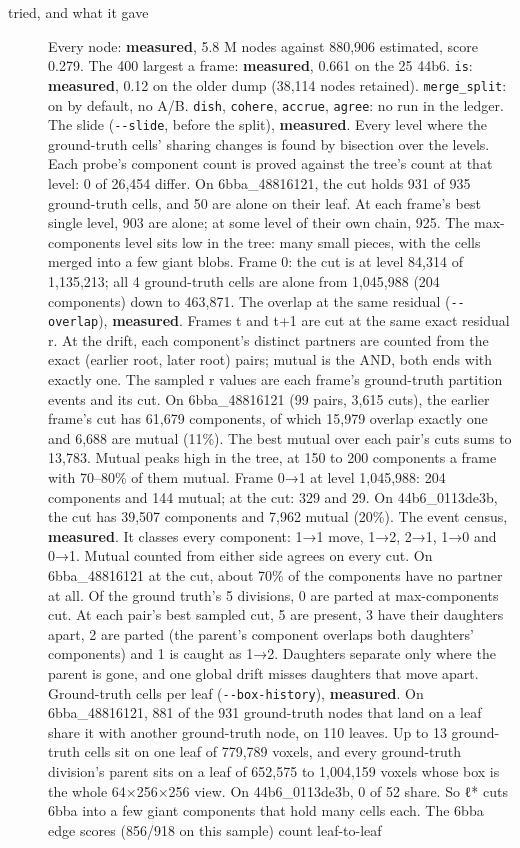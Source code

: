 \begin{description}
\item[{tried, and what it gave}] Every node: \textbf{measured}, 5.8 M nodes against 880,906 estimated, score 0.279. The 400 largest a frame: \textbf{measured}, 0.661 on the 25 44b6. \texttt{is}: \textbf{measured}, 0.12 on the older dump (38,114 nodes retained). \texttt{merge\_\allowbreak{}split}: on by default, no A/B. \texttt{dish}, \texttt{cohere}, \texttt{accrue}, \texttt{agree}: no run in the ledger. The slide (\texttt{-\allowbreak{}-\allowbreak{}slide}, before the split), \textbf{measured}. Every level where the ground-truth cells' sharing changes is found by bisection over the levels. Each probe's component count is proved against the tree's count at that level: 0 of 26,454 differ. On 6bba\_\allowbreak{}48816121, the cut holds 931 of 935 ground-truth cells, and 50 are alone on their leaf. At each frame's best single level, 903 are alone; at some level of their own chain, 925. The max-components level sits low in the tree: many small pieces, with the cells merged into a few giant blobs. Frame 0: the cut is at level 84,314 of 1,135,213; all 4 ground-truth cells are alone from 1,045,988 (204 components) down to 463,871. The overlap at the same residual (\texttt{-\allowbreak{}-\allowbreak{}overlap}), \textbf{measured}. Frames t and t+1 are cut at the same exact residual r. At the drift, each component's distinct partners are counted from the exact (earlier root, later root) pairs; mutual is the AND, both ends with exactly one. The sampled r values are each frame's ground-truth partition events and its cut. On 6bba\_\allowbreak{}48816121 (99 pairs, 3,615 cuts), the earlier frame's cut has 61,679 components, of which 15,979 overlap exactly one and 6,688 are mutual (11\%). The best mutual over each pair's cuts sums to 13,783. Mutual peaks high in the tree, at 150 to 200 components a frame with 70–80\% of them mutual. Frame 0→1 at level 1,045,988: 204 components and 144 mutual; at the cut: 329 and 29. On 44b6\_\allowbreak{}0113de3b, the cut has 39,507 components and 7,962 mutual (20\%). The event census, \textbf{measured}. It classes every component: 1→1 move, 1→2, 2→1, 1→0 and 0→1. Mutual counted from either side agrees on every cut. On 6bba\_\allowbreak{}48816121 at the cut, about 70\% of the components have no partner at all. Of the ground truth's 5 divisions, 0 are parted at max-components cut. At each pair's best sampled cut, 5 are present, 3 have their daughters apart, 2 are parted (the parent's component overlaps both daughters' components) and 1 is caught as 1→2. Daughters separate only where the parent is gone, and one global drift misses daughters that move apart. Ground-truth cells per leaf (\texttt{-\allowbreak{}-\allowbreak{}box-\allowbreak{}history}), \textbf{measured}. On 6bba\_\allowbreak{}48816121, 881 of the 931 ground-truth nodes that land on a leaf share it with another ground-truth node, on 110 leaves. Up to 13 ground-truth cells sit on one leaf of 779,789 voxels, and every ground-truth division's parent sits on a leaf of 652,575 to 1,004,159 voxels whose box is the whole 64×256×256 view. On 44b6\_\allowbreak{}0113de3b, 0 of 52 share. So ℓ* cuts 6bba into a few giant components that hold many cells each. The 6bba edge scores (856/918 on this sample) count leaf-to-leaf 
\end{description}
